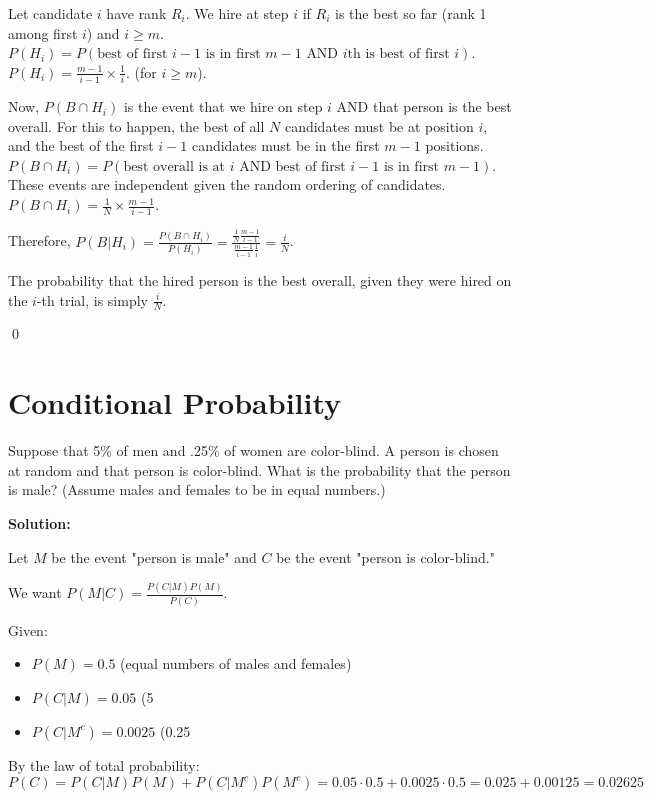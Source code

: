 Let candidate $i$ have rank $R_i$. We hire at step $i$ if $R_i$ is the best so far (rank 1 among first $i$) and $i \ge m$.
$P(H_i) = P(\text{best of first } i-1 \text{ is in first } m-1 \text{ AND } i\text{th is best of first }i)$.
$P(H_i) = \frac{m-1}{i-1} \times \frac{1}{i}$. (for $i \ge m$).

Now, $P(B \cap H_i)$ is the event that we hire on step $i$ AND that person is the best overall.
For this to happen, the best of all $N$ candidates must be at position $i$, and the best of the first $i-1$ candidates must be in the first $m-1$ positions.
$P(B \cap H_i) = P(\text{best overall is at } i \text{ AND best of first } i-1 \text{ is in first } m-1)$.
These events are independent given the random ordering of candidates.
$P(B \cap H_i) = \frac{1}{N} \times \frac{m-1}{i-1}$.

Therefore, $P(B|H_i) = \frac{P(B \cap H_i)}{P(H_i)} = \frac{\frac{1}{N} \frac{m-1}{i-1}}{\frac{m-1}{i-1} \frac{1}{i}} = \frac{i}{N}$.

The probability that the hired person is the best overall, given they were hired on the $i$-th trial, is simply $\frac{i}{N}$.


\qed
\section{Conditional Probability}

\begin{problembox}
Suppose that 5\% of men and .25\% of women are color-blind. A person is chosen at random and that person is color-blind. What is the probability that the person is male? (Assume males and females to be in equal numbers.)
\end{problembox}

\noindent\textbf{Solution:}

Let $M$ be the event "person is male" and $C$ be the event "person is color-blind."

We want $P(M|C) = \frac{P(C|M)P(M)}{P(C)}$.

Given:
\begin{itemize}
\item $P(M) = 0.5$ (equal numbers of males and females)
\item $P(C|M) = 0.05$ (5%
\item $P(C|M^c) = 0.0025$ (0.25%
\end{itemize}

By the law of total probability:
$P(C) = P(C|M)P(M) + P(C|M^c)P(M^c) = 0.05 \cdot 0.5 + 0.0025 \cdot 0.5 = 0.025 + 0.00125 = 0.02625$

